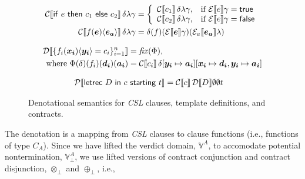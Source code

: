 \documentclass[orivec,final]{llncs-href}
\newcommand{\verdictset}[1]{\mathbb{V}^{#1}}
\newcommand{\verdictsetlift}[1]{\verdictset{#1}_{\bot}}
\newcommand{\dendom}[1]{\llbracket #1 \rrbracket}
\newcommand{\proofsep}{\vspace{15pt}}
\newcommand{\csl}{\textit{CSL}}
\newcommand{\ccontract}[3]{\mathsf{letrec}\ #1\ \mathsf{in}\ #2\
  \mathsf{starting}\ #3}
\newcommand{\cifthenelse}[3]{\mathsf{if}\ #1\ \mathsf{then}\ #2\
  \mathsf{else}\ #3}
\newcommand{\cinstantiate}[3]{#1(#2)\langle#3\rangle}
\newcommand{\ctrue}{\mathsf{true}}
\newcommand{\cfalse}{\mathsf{false}}
\newcommand{\cifthenelsedefault}{\cifthenelse{e}{c_1}{c_2}}
\newcommand{\cinstantiatedefault}{\cinstantiate{f}{\vec{e}}{\vec{e_a}}}
\begin{document}
\begin{figure}
\begin{align*}
    \cdenclause{\cifthenelsedefault}{\delta}{\lambda}{\gamma}{}{}
    &= \left\{
      \begin{array}{ll}
        \cdenclause{c_1}{\delta}{\lambda}{\gamma}{}{}, & \mbox{if
        } \cdenexp{e}{\gamma} = \ctrue\\
        \cdenclause{c_2}{\delta}{\lambda}{\gamma}{}{}, & \mbox{if
        } \cdenexp{e}{\gamma} = \cfalse
      \end{array}
    \right.\\
    \cdenclause{\cinstantiatedefault}{\delta}{\lambda}{\gamma}{}{}
    &=
    \delta(f)(\cdenexp{\vec{e}}{\gamma})(\cdenaexp{\vec{e_a}}{\lambda})
  \end{align*}

  \proofsep{}

  \fbox{$\cdencontext{\ctcontext{D}{\Delta}} :
    \dendom{\ctcontext{D}{\Delta}}$}
  \begin{align*}
    \cdencontext{\{\cinstantiate{f_i}{\vec{x_i}}{\vec{y_i}} =
      c_i\}_{i = 1}^n} &= \mathit{fix}(\Phi),\\
    \mbox{where } \Phi(\delta)(f_i)(\vec{d_i})(\vec{a_i}) &=
    \cdenclause{c_i}{\delta}{[\vec{y_i} \mapsto
      \vec{a_i}]}{[\vec{x_i} \mapsto \vec{d_i},\vec{y_i} \mapsto
      \vec{a_i}]}{}
  \end{align*}

  \proofsep{}

  \fbox{$\cdencontract{\ctcontract{p}{A}} :
    \dendom{\ctcontract{p}{A}}$}
  \begin{align*}
    \cdencontract{\ccontract{D}{c}{t}} &=
    \cdenclause{c}{\cdencontext{D}}{\emptyset}{\emptyset}{t}
  \end{align*}
  \caption{Denotational semantics for \csl{} clauses, template
    definitions, and contracts.}
  \label{fig:cdenclausecontract}
\end{figure}
The denotation is a mapping from \csl{} clauses to clause functions
(i.e., functions of type $C_A$). Since we have lifted the verdict domain,
$\verdictset{A}$, to accomodate potential nontermination,
$\verdictsetlift{A}$, we use lifted versions of contract conjunction
and contract disjunction, $\otimes_\bot$ and $\oplus_\bot$, i.e.,
\end{document}
